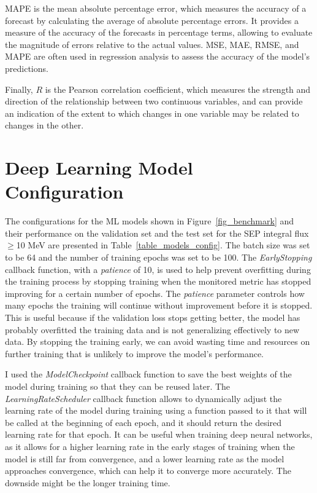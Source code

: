 MAPE is the mean absolute percentage error, which measures the accuracy of a forecast by calculating the average of absolute percentage errors. It provides a measure of the accuracy of the forecasts in percentage terms, allowing to evaluate the magnitude of errors relative to the actual values.
MSE, MAE, RMSE, and MAPE are often used in regression analysis to assess the accuracy of the model's predictions.

Finally, $R$ is the Pearson correlation coefficient, which measures the strength and direction of the relationship between two continuous variables, and can provide an indication of the extent to which changes in one variable may be related to changes in the other.

\section{Deep Learning Model Configuration}
\label{config_appendix}
The configurations for the ML models shown in Figure~\ref{fig_benchmark} and their performance on the validation set and the test set for the SEP integral flux $\geq$10 MeV are presented in Table~\ref{table_models_config}.
The batch size was set to be 64 and the number of training epochs was set to be 100. 
The \textit{EarlyStopping} callback function, with a \textit{patience} of 10, is used to help prevent overfitting during the training process by stopping training when the monitored metric has stopped improving for a certain number of epochs.
The \textit{patience} parameter controls how many epochs the training will continue without improvement before it is stopped. This is useful because if the validation loss stops getting better, the model has probably overfitted the training data and is not generalizing effectively to new data. By stopping the training early, we can avoid wasting time and resources on further training that is unlikely to improve the model's performance.

I used the \textit{ModelCheckpoint} callback function to save the best weights of the model during training so that they can be reused later.
The \textit{LearningRateScheduler} callback function allows to dynamically adjust the learning rate of the model during training using a function passed to it that will be called at the beginning of each epoch, and it should return the desired learning rate for that epoch. It can be useful when training deep neural networks, as it allows for a higher learning rate in the early stages of training when the model is still far from convergence, and a lower learning rate as the model approaches convergence, which can help it to converge more accurately. The downside might be the longer training time.

